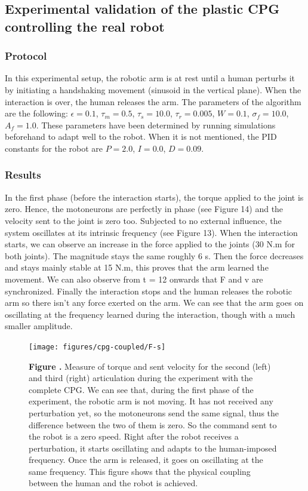 \subsection{Experimental validation of the plastic CPG controlling the real robot}

\subsubsection{Protocol}
In this experimental setup, the robotic arm is at rest until a human perturbs it by initiating a handshaking movement (sinusoid in the vertical plane). When the interaction is over, the human releases the arm.
The parameters of the algorithm are the following: $\epsilon = 0.1$, $\tau_{m} = 0.5$, $\tau_{s} = 10.0$, $\tau_{r} = 0.005$, $W = 0.1$, $\sigma_{f} = 10.0$, $A_{f} = 1.0$. These parameters have been determined by running simulations beforehand to adapt well to the robot. When it is not mentioned, the PID constants for the robot are $P = 2.0$, $I = 0.0$, $D = 0.09$.

\subsubsection{Results}

In the first phase (before the interaction starts), the torque applied to the joint is zero. Hence, the motoneurons are perfectly in phase (see Figure 14) and the velocity sent to the joint is zero too. Subjected to no external influence, the system oscillates at its intrinsic frequency (see Figure 13). When the interaction starts, we can observe an increase in the force applied to the joints (30 N.m for both joints). The magnitude stays the same roughly 6 s. Then the force decreases and stays mainly stable at 15 N.m, this proves that the arm learned the movement. We can also observe from t = 12 onwards that F and v are synchronized. Finally the interaction stops and the human releases the robotic arm so there isn't any force exerted on the arm. We can see that the arm goes on oscillating at the frequency learned during the interaction, though with a much smaller amplitude.

\begin{figure}[h!]
\begin{center}
\texttt{[image: figures/cpg-coupled/F-s]}
\end{center}
\textbf{\label{fig:16} Figure .}{ Measure of torque and sent velocity for the second (left) and third (right) articulation during the experiment with the complete CPG. We can see that, during the first phase of the experiment, the robotic arm is not moving. It has not received any perturbation yet, so the motoneurons send the same signal, thus the difference between the two of them is zero. So the command sent to the robot is a zero speed. Right after the robot receives a perturbation, it starts oscillating and adapts to the human-imposed frequency. Once the arm is released, it goes on oscillating at the same frequency. This figure shows that the physical coupling between the human and the robot is achieved.}
\end{figure}

